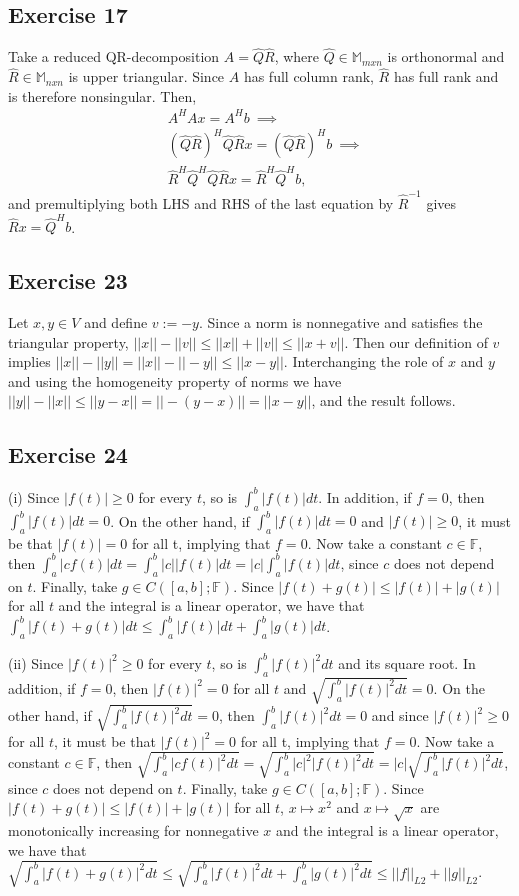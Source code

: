 \documentclass[11.5pt, letterpaper, bibtotoc,
    tablecaptionabove, figurecaptionabove]{article}
\begin{document}
\subsection*{Exercise 17}
Take a reduced QR-decomposition $A=\hat{Q}\hat{R}$,
where $\hat{Q}\in\mathbb M_{mxn}$ is orthonormal and $\hat{R}\in\mathbb M_{nxn}$ is upper triangular.
Since $A$ has full column rank, $\hat{R}$ has full rank and is therefore nonsingular.
Then,
\begin{align*}
    &A^HAx=A^Hb\ \implies\\ 
    &(\hat{Q}\hat{R})^H\hat{Q}\hat{R}x = (\hat{Q}\hat{R})^Hb\ \implies\\
    &\hat{R}^H\hat{Q}^H\hat{Q}\hat{R}x = \hat{R}^H\hat{Q}^Hb,
\end{align*}
and premultiplying both LHS and RHS of the last equation by $\hat{R}^{-1}$ gives
$\hat{R}x = \hat{Q}^Hb$.

\subsection*{Exercise 23}
Let $x,y\in V$ and define $v:=-y$.
Since a norm is nonnegative and satisfies the triangular property, 
$||x||-||v||\leq ||x||+||v||\leq||x+v||$.
Then our definition of $v$ implies $||x||-||y||=||x||-||-y||\leq||x-y||$.
Interchanging the role of $x$ and $y$ and using the homogeneity property of norms we have
$||y||-||x||\leq||y-x||=||-(y-x)||=||x-y||$,
and the result follows.

\subsection*{Exercise 24}
(i)
Since $|f(t)|\geq 0$ for every $t$, so is $\int_a^b|f(t)|dt$.
In addition, if $f=0$, then $\int_a^b|f(t)|dt=0$.
On the other hand, if $\int_a^b|f(t)|dt=0$ and $|f(t)|\geq 0$, it must be that
$|f(t)|=0$ for all t, implying that $f=0$.
Now take a constant $c\in\mathbb F$, then 
$\int_a^b|cf(t)|dt=\int_a^b|c||f(t)|dt=|c|\int_a^b|f(t)|dt$,
since $c$ does not depend on $t$.
Finally, take $g\in C([a, b]; \mathbb F)$.
Since $|f(t)+g(t)|\leq|f(t)|+|g(t)|$ for all $t$ and the integral is a linear operator,
we have that $\int_a^b|f(t)+g(t)|dt\leq\int_a^b|f(t)|dt + \int_a^b|g(t)|dt$.

(ii)
Since $|f(t)|^2\geq 0$ for every $t$, so is $\int_a^b|f(t)|^2dt$ and its square root.
In addition, if $f=0$, then $|f(t)|^2=0$ for all $t$ and $\sqrt{\int_a^b|f(t)|^2dt}=0$.
On the other hand, if $\sqrt{\int_a^b|f(t)|^2dt}=0$, 
then $\int_a^b|f(t)|^2dt=0$ and since $|f(t)|^2\geq 0$ for all $t$, 
it must be that $|f(t)|^2=0$ for all t, implying that $f=0$.
Now take a constant $c\in\mathbb F$, then 
$\sqrt{\int_a^b|cf(t)|^2dt}=\sqrt{\int_a^b|c|^2|f(t)|^2dt}=|c|\sqrt{\int_a^b|f(t)|^2dt}$,
since $c$ does not depend on $t$.
Finally, take $g\in C([a, b]; \mathbb F)$.
Since $|f(t)+g(t)|\leq|f(t)|+|g(t)|$ for all $t$, 
$x\mapsto x^2$ and $x\mapsto\sqrt{x}$ are monotonically increasing for nonnegative $x$ 
and the integral is a linear operator,
we have that $\sqrt{\int_a^b|f(t)+g(t)|^2dt}\leq\sqrt{\int_a^b|f(t)|^2dt + \int_a^b|g(t)|^2dt}
\leq||f||_{L2}+||g||_{L2}$.
\end{document}
